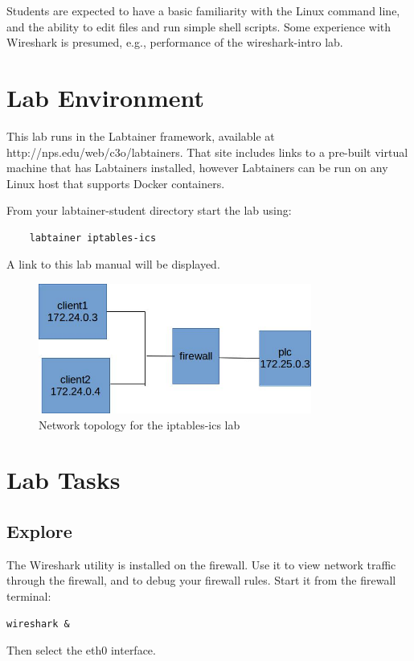Students are expected to have a basic 
familiarity with the Linux command line, and the ability to edit files and
run simple shell scripts. Some experience with Wireshark is presumed, e.g., performance of
the wireshark-intro lab.

\section{Lab Environment}
This lab runs in the Labtainer framework,
available at http://nps.edu/web/c3o/labtainers.
That site includes links to a pre-built virtual machine
that has Labtainers installed, however Labtainers can
be run on any Linux host that supports Docker containers.

From your labtainer-student directory start the lab using:
\begin{verbatim}
    labtainer iptables-ics
\end{verbatim}
\noindent A link to this lab manual will be displayed.  


\begin{figure}[H]
\begin{center}
\includegraphics [width=0.8\textwidth]{iptables-ics.jpg}
\end{center}
\caption{Network topology for the iptables-ics lab}
\label{fig:topology}
\end{figure}

\section{Lab Tasks}
\subsection{Explore}
The Wireshark utility is installed on the firewall. 
Use it to view network traffic through the firewall, and to 
debug your firewall rules.  Start it from the firewall terminal:
\begin{verbatim}
wireshark &
\end{verbatim}
\noindent Then select the eth0 interface.

